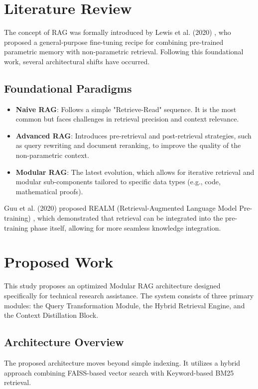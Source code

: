 \documentclass[11pt,a4paper,oneside]{report}
\begin{document}
\chapter{Literature Review}
\label{ch:lit_review}

The concept of RAG was formally introduced by Lewis et al. (2020) \cite{lewis2020rag}, who proposed a general-purpose fine-tuning recipe for combining pre-trained parametric memory with non-parametric retrieval. Following this foundational work, several architectural shifts have occurred.

\section{Foundational Paradigms}
\begin{itemize}
    \item \textbf{Naive RAG}: Follows a simple "Retrieve-Read" sequence. It is the most common but faces challenges in retrieval precision and context relevance.
    \item \textbf{Advanced RAG}: Introduces pre-retrieval and post-retrieval strategies, such as query rewriting and document reranking, to improve the quality of the non-parametric context.
    \item \textbf{Modular RAG}: The latest evolution, which allows for iterative retrieval and modular sub-components tailored to specific data types (e.g., code, mathematical proofs).
\end{itemize}

Guu et al. (2020) proposed REALM (Retrieval-Augmented Language Model Pre-training) \cite{guu2020realm}, which demonstrated that retrieval can be integrated into the pre-training phase itself, allowing for more seamless knowledge integration.

\chapter{Proposed Work}
\label{ch:proposed}

This study proposes an optimized Modular RAG architecture designed specifically for technical research assistance. The system consists of three primary modules: the Query Transformation Module, the Hybrid Retrieval Engine, and the Context Distillation Block.

\section{Architecture Overview}
The proposed architecture moves beyond simple indexing. It utilizes a hybrid approach combining FAISS-based vector search with Keyword-based BM25 retrieval.
\end{document}

